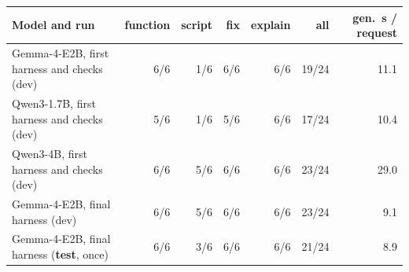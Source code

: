 \begin{tabular}{lrrrrrr}
\toprule
Model and run & function & script & fix & explain & all & gen.\ s / request \\
\midrule
Gemma-4-E2B, first harness and checks (dev) & 6/6 & 1/6 & 6/6 & 6/6 & 19/24 & 11.1 \\
Qwen3-1.7B, first harness and checks (dev) & 5/6 & 1/6 & 5/6 & 6/6 & 17/24 & 10.4 \\
Qwen3-4B, first harness and checks (dev) & 6/6 & 5/6 & 6/6 & 6/6 & 23/24 & 29.0 \\
\midrule
Gemma-4-E2B, final harness (dev) & 6/6 & 5/6 & 6/6 & 6/6 & 23/24 & 9.1 \\
Gemma-4-E2B, final harness (\textbf{test}, once) & 6/6 & 3/6 & 6/6 & 6/6 & 21/24 & 8.9 \\
\bottomrule
\end{tabular}

